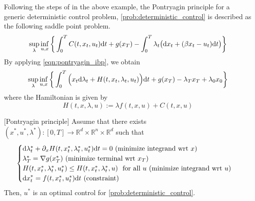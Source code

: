 \documentclass[11pt]{book}
\newcommand{\dd}{\text{\normalfont d}}
\newcommand{\dt}{\text{\normalfont d}t}
\newcommand{\dx}{\text{\normalfont d}x}
\begin{document}
Following the steps of in the above example, the Pontryagin principle for a generic deterministic control problem, \ref{prob:deterministic_control} is described as the following saddle point problem.
\begin{equation}\label{eqn:sup_inf}
    \sup_{\lambda}\inf_{u,x}\bigg\{\int_0^TC(t,x_t,u_t) {\dt} +g(x_T) - \int_0^T \lambda_t \big({\dx}_t + (\beta x_t  - u_t ){\dt}\big)\bigg\}
\end{equation}
By applying \eqref{eqn:pontryagin_ibp}, we obtain 
\begin{equation}
    \sup_{\lambda}\inf_{u,x}\bigg\{\int_0^T\Big(x_t {\dd}\lambda_t+ H(t,x_t,\lambda_t,u_t)\Big) {\dt} +g(x_T) - \lambda_T x_T + \lambda_0 x_0\bigg\}
\end{equation}
where the Hamiltonian is given by 
\begin{equation}
    H(t,x,\lambda,u):=\lambda f(t,x,u)+ C(t,x,u)
\end{equation} 
\begin{thm}\label{thm:pontryagin_deterministic}
    [Pontryagin principle]
    Assume that there exists $(x^*,u^*,\lambda^*):[0,T]\to\mathbb{R}^d\times\mathbb{R}^n\times\mathbb{R}^d$ such that
    \begin{equation}\label{eqn:pontryagin_determinimstic}
    \begin{cases}
        {\dd}\lambda^*_t+ \partial_x H(t,x^*_t,\lambda^*_t,u^*_t){\dt}=0~ (\textrm{minimize integrand wrt $x$})\\
        \lambda^*_T=\nabla g(x^*_T) ~(\textrm{minimize terminal wrt $x_T$})\\
        H(t,x^*_t,\lambda^*_t,u^*_t)\le H(t,x^*_t,\lambda^*_t,u)~\textrm{ for all } u ~(\textrm{minimize integrand wrt $u$})\\
        {\dx}^*_t = f(t,x^*_t,u^*_t) {\dt} ~(\textrm{constraint})
        \end{cases}
\end{equation}
Then, $u^*$ is an optimal control for \eqref{prob:deterministic_control}.
\end{thm}
\end{document}
